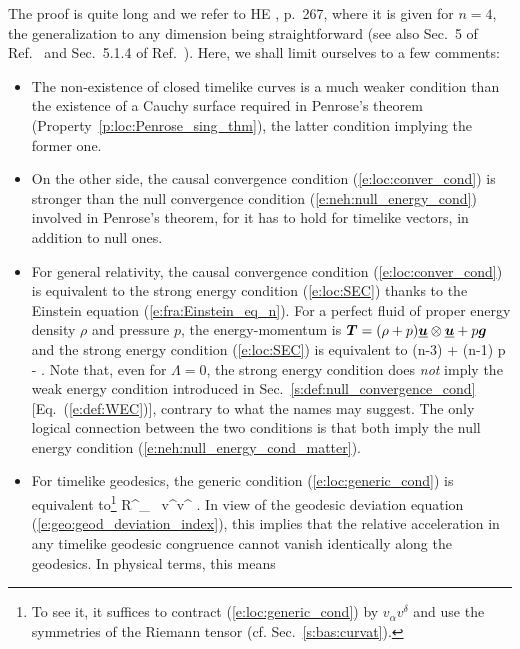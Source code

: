 The proof is quite long and we refer to HE \cite{HawkiE73}, p.~267, where
it is given for $n=4$, the generalization to any dimension being
straightforward (see also Sec.~5 of Ref.~\cite{Senov98} and Sec.~5.1.4 of Ref.~\cite{SenovG15}).
Here, we shall limit ourselves to a few comments:
\begin{itemize}
\item The non-existence of closed timelike curves is a much weaker condition
than the existence of a Cauchy surface required in Penrose's theorem
(Property~\ref{p:loc:Penrose_sing_thm}), the latter condition implying the former one.
\item On the other side, the causal convergence condition (\ref{e:loc:conver_cond}) is stronger
than the null convergence condition (\ref{e:neh:null_energy_cond}) involved
in Penrose's theorem, for
it has to hold for timelike vectors, in addition to null ones.
\item For general relativity,
the causal convergence condition (\ref{e:loc:conver_cond}) is equivalent to
the strong energy condition (\ref{e:loc:SEC}) thanks to the
Einstein equation (\ref{e:fra:Einstein_eq_n}).
For a perfect fluid of proper energy density $\rho$ and pressure $p$,
the energy-momentum is
$\bm{T} = (\rho + p) \underline{\bm{u}}\otimes\underline{\bm{u}} + p \bm{g}$ and the strong energy condition
(\ref{e:loc:SEC}) is equivalent to
\be \label{e:loc:SEC_fluid}
    (n-3) \rho + (n-1) p - \frac{\Lambda}{4\pi}  .
\ee
Note that, even for $\Lambda=0$, the strong energy condition does \emph{not} imply the
weak energy condition
introduced in Sec.~\ref{s:def:null_convergence_cond} [Eq.~(\ref{e:def:WEC})],
contrary to what the names may suggest. The only logical connection between
the two conditions is that both imply the null energy condition (\ref{e:neh:null_energy_cond_matter}).
\item For timelike geodesics, the generic condition (\ref{e:loc:generic_cond})
is equivalent to\footnote{To see it, it suffices to contract (\ref{e:loc:generic_cond}) by
$v_\alpha v^\delta$ and use the symmetries of the Riemann tensor (cf. Sec.~\ref{s:bas:curvat}).}
\be \label{e:loc:gen_cond_timelike}
    R^\alpha_{\ \; \mu\nu\beta} v^\mu v^\nu {} .
\ee
In view of the geodesic deviation equation
(\ref{e:geo:geod_deviation_index}), this implies that the relative acceleration in any timelike
geodesic congruence cannot vanish identically along the geodesics. In physical terms, this means

\end{itemize}
